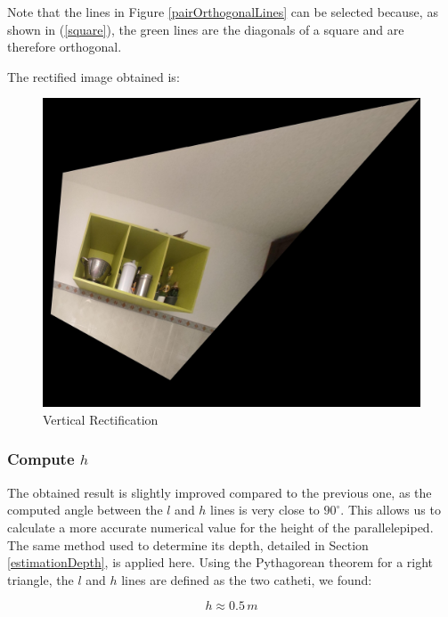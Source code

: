 Note that the lines in Figure \ref{pairOrthogonalLines} can be selected because, as shown in (\ref{square}), the green lines are the diagonals of a square and are therefore orthogonal.

The rectified image obtained is:
\begin{figure}[H]
    \centering
    \includegraphics[width=0.75\linewidth]{img/G3/verticalRectificationMetric.jpg}
    \caption{Vertical Rectification}
    \label{fig:verticalRectMetric}
\end{figure}

\subsubsection{Compute $h$}
The obtained result is slightly improved compared to the previous one, as the computed angle between the $l$ and $h$ lines is very close to $90^\circ$. This allows us to calculate a more accurate numerical value for the height of the parallelepiped. The same method used to determine its depth, detailed in Section \ref{estimationDepth}, is applied here. Using the Pythagorean theorem for a right triangle, the $l$ and $h$ lines are defined as the two catheti, we found:

$$h \approx 0.5 \, m$$
